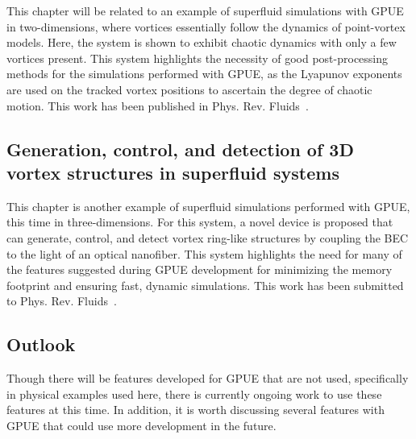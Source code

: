 This chapter will be related to an example of superfluid simulations with GPUE in two-dimensions, where vortices essentially follow the dynamics of point-vortex models.
Here, the system is shown to exhibit chaotic dynamics with only a few vortices present.
This system highlights the necessity of good post-processing methods for the simulations performed with GPUE, as the Lyapunov exponents are used on the tracked vortex positions to ascertain the degree of chaotic motion.
This work has been published in Phys. Rev. Fluids~\cite{zhang2019}.

\subsection*{Generation, control, and detection of 3D vortex structures in superfluid systems}

This chapter is another example of superfluid simulations performed with GPUE, this time in three-dimensions.
For this system, a novel device is proposed that can generate, control, and detect vortex ring-like structures by coupling the BEC to the light of an optical nanofiber.
This system highlights the need for many of the features suggested during GPUE development for minimizing the memory footprint and ensuring fast, dynamic simulations.
This work has been submitted to Phys. Rev. Fluids~\cite{schloss2019}.

\subsection*{Outlook}
Though there will be features developed for GPUE that are not used, specifically in physical examples used here, there is currently ongoing work to use these features at this time.
In addition, it is worth discussing several features with GPUE that could use more development in the future.
